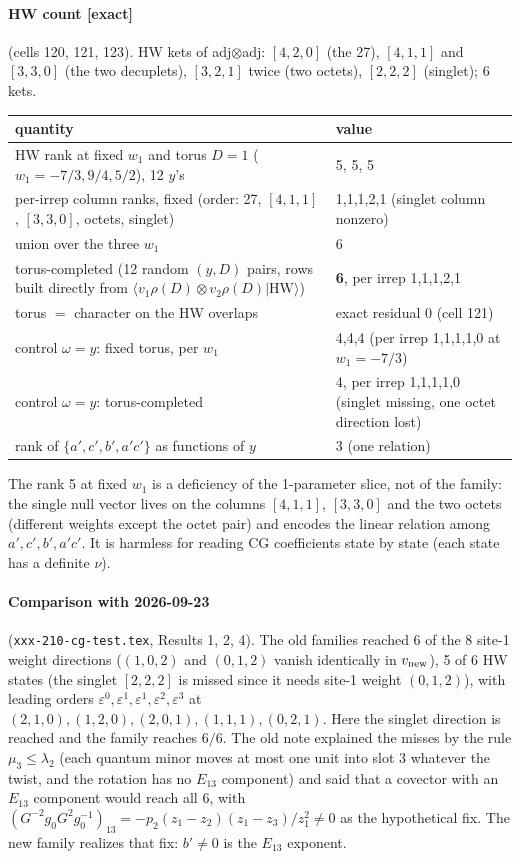 \documentclass[11pt]{article}
\newcommand{\ex}{\textbf{[exact]}}
\newcommand{\nb}[1]{\texttt{#1}}
\begin{document}
\paragraph{HW count \ex} (cells 120, 121, 123). HW kets of adj$\otimes$adj: $[4,2,0]$ (the 27), $[4,1,1]$ and $[3,3,0]$ (the two decuplets), $[3,2,1]$ twice (two octets), $[2,2,2]$ (singlet); 6 kets.
\begin{center}\small
\begin{tabular}{@{}p{9.5cm}p{5.5cm}@{}}\toprule
quantity & value\\\midrule
HW rank at fixed $w_1$ and torus $D=1$ ($w_1=-7/3,9/4,5/2$), 12 $y$'s & 5, 5, 5\\
per-irrep column ranks, fixed (order: 27, $[4,1,1]$, $[3,3,0]$, octets, singlet) & 1,1,1,2,1 (singlet column nonzero)\\
union over the three $w_1$ & 6\\
torus-completed (12 random $(y,D)$ pairs, rows built directly from $\langle v_1\rho(D)\otimes v_2\rho(D)|\mathrm{HW}\rangle$) & \textbf{6}, per irrep 1,1,1,2,1\\
torus $=$ character on the HW overlaps & exact residual 0 (cell 121)\\
control $\omega=y$: fixed torus, per $w_1$ & 4,4,4 (per irrep 1,1,1,1,0 at $w_1=-7/3$)\\
control $\omega=y$: torus-completed & 4, per irrep 1,1,1,1,0 (singlet missing, one octet direction lost)\\
rank of $\{a',c',b',a'c'\}$ as functions of $y$ & 3 (one relation)\\\bottomrule
\end{tabular}
\end{center}
The rank 5 at fixed $w_1$ is a deficiency of the 1-parameter slice, not of the family: the single null vector lives on the columns $[4,1,1]$, $[3,3,0]$ and the two octets (different weights except the octet pair) and encodes the linear relation among $a',c',b',a'c'$. It is harmless for reading CG coefficients state by state (each state has a definite $\nu$).

\paragraph{Comparison with 2026-09-23} (\nb{xxx-210-cg-test.tex}, Results 1, 2, 4). The old families reached 6 of the 8 site-1 weight directions ($(1,0,2)$ and $(0,1,2)$ vanish identically in $v_{\rm new}$), 5 of 6 HW states (the singlet $[2,2,2]$ is missed since it needs site-1 weight $(0,1,2)$), with leading orders $\varepsilon^0,\varepsilon^1,\varepsilon^1,\varepsilon^2,\varepsilon^3$ at $(2,1,0),(1,2,0),(2,0,1),(1,1,1),(0,2,1)$. Here the singlet direction is reached and the family reaches $6/6$. The old note explained the misses by the rule $\mu_3\le\lambda_2$ (each quantum minor moves at most one unit into slot 3 whatever the twist, and the rotation has no $E_{13}$ component) and said that a covector with an $E_{13}$ component would reach all 6, with $(G^{-2}g_0G^2g_0^{-1})_{13}=-p_2(z_1-z_2)(z_1-z_3)/z_1^2\ne0$ as the hypothetical fix. The new family realizes that fix: $b'\ne0$ is the $E_{13}$ exponent.
\end{document}
